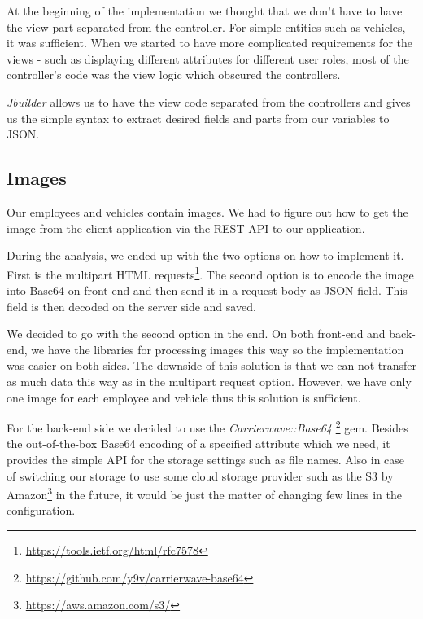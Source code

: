	At the beginning of the implementation we thought that we don't have to have the view part separated from the controller. For simple entities such as vehicles, it was sufficient. When we started to have more complicated requirements for the views - such as displaying different attributes for different user roles, most of the controller's code was the view logic which obscured the controllers.
	
	\textit{Jbuilder} allows us to have the view code separated from the controllers and gives us the simple syntax to extract desired fields and parts from our variables to JSON.
\subsection{Images}
	Our employees and vehicles contain images. We had to figure out how to get the image from the client application via the REST API to our application. 
	
	During the analysis, we ended up with the two options on how to implement it. First is the multipart HTML requests\footnote{\url{https://tools.ietf.org/html/rfc7578}}. The second option is to encode the image into Base64 on front-end and then send it in a request body as JSON field. This field is then decoded on the server side and saved.
	
	We decided to go with the second option in the end. On both front-end and back-end, we have the libraries for processing images this way so the implementation was easier on both sides. The downside of this solution is that we can not transfer as much data this way as in the multipart request option. However, we have only one image for each employee and vehicle thus this solution is sufficient.
	
	For the back-end side we decided to use the \textit{Carrierwave::Base64} \footnote{\url{https://github.com/y9v/carrierwave-base64}} gem. Besides the out-of-the-box Base64 encoding of a specified attribute which we need, it provides the simple API for the storage settings such as file names. Also in case of switching our storage to use some cloud storage provider such as the S3 by Amazon\footnote{\url{https://aws.amazon.com/s3/}} in the future, it would be just the matter of changing few lines in the configuration. 

